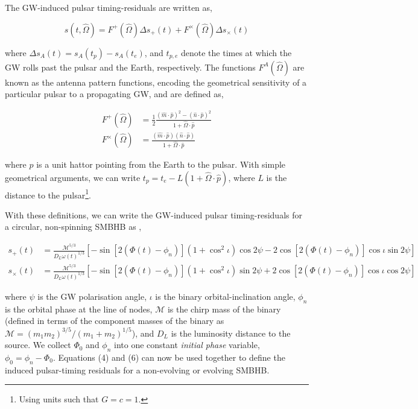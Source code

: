 \documentclass[prd,showpacs,nofootinbib]{revtex4}
\begin{document}
The GW-induced pulsar timing-residuals are written as,

\begin{equation}
s(t,\hat\Omega) = F^+(\hat\Omega)\Delta s_+(t) + F^\times(\hat\Omega)\Delta s_\times(t)
\end{equation}

where $\Delta s_A(t) = s_A(t_p) - s_A(t_e)$, and $t_{p,e}$ denote the times at which the GW rolls past the pulsar and the Earth, respectively. The functions $F^A(\hat\Omega)$ are known as the antenna pattern functions, encoding the geometrical sensitivity of a particular pulsar to a propagating GW, and are defined as,

\begin{align}
F^+(\hat\Omega) &= \frac{1}{2}\frac{(\hat{m}\cdot\hat{p})^2 - (\hat{n}\cdot\hat{p})^2}{1+\hat\Omega\cdot\hat{p}} \\\nonumber
F^\times(\hat\Omega) &= \frac{(\hat{m}\cdot\hat{p})(\hat{n}\cdot\hat{p})}{1+\hat\Omega\cdot\hat{p}}
\end{align}

where $\hat{p}$ is a unit hattor pointing from the Earth to the pulsar. With simple geometrical arguments, we can write $t_p = t_e - L(1+\hat\Omega\cdot\hat{p})$, where $L$ is the distance to the pulsar\footnote{Using units such that $G=c=1.$}.

With these definitions, we can write the GW-induced pulsar timing-residuals for a circular, non-spinning SMBHB as \citep{wahlquist-1987,corbin-cornish-2010,ellis_optimal},

\begin{align}
s_+(t) &= \frac{\mathcal{M}^{5/3}}{D_L\omega(t)^{1/3}}\left[-\sin\left[2\left(\Phi(t)-\phi_n\right)\right]\left(1+\cos^2\iota\right)\cos2\psi - 2\cos\left[2\left(\Phi(t)-\phi_n\right)\right]\cos\iota\sin2\psi\right] \\\nonumber
s_\times(t) &= \frac{\mathcal{M}^{5/3}}{D_L\omega(t)^{1/3}}\left[-\sin\left[2\left(\Phi(t)-\phi_n\right)\right]\left(1+\cos^2\iota\right)\sin2\psi + 2\cos\left[2\left(\Phi(t)-\phi_n\right)\right]\cos\iota\cos2\psi\right]
\end{align}

where $\psi$ is the GW polarisation angle, $\iota$ is the binary orbital-inclination angle, $\phi_n$ is the orbital phase at the line of nodes, $\mathcal{M}$ is the chirp mass of the binary (defined in terms of the component masses of the binary as $\mathcal{M} = \left(m_1m_2\right)^{3/5}/\left(m_1 + m_2\right)^{1/5}$), and $D_L$ is the luminosity distance to the source. We collect $\Phi_0$ and $\phi_n$ into one constant {\it initial phase} variable, $\phi_0 = \phi_n - \Phi_0$. Equations (4) and (6) can now be used together to define the induced pulsar-timing residuals for a non-evolving or evolving SMBHB.
\end{document}
